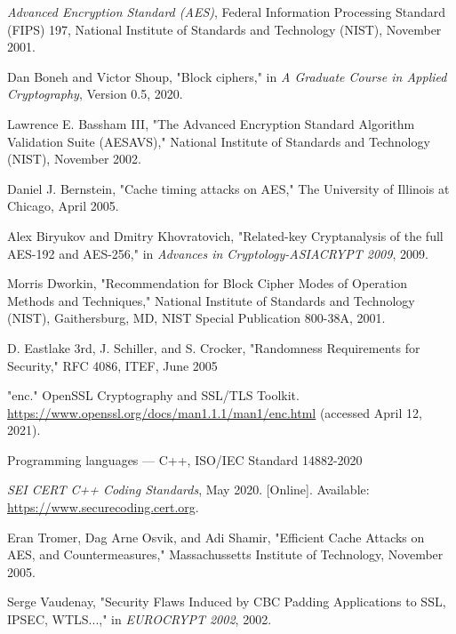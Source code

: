 \documentclass[a4paper,12pt]{article}
\begin{document}
\begin{thebibliography}{99}

 \textit{Advanced Encryption Standard (AES)}, Federal Information Processing Standard (FIPS) 197, National Institute of Standards and Technology (NIST), November 2001.

 Dan Boneh and Victor Shoup, "Block ciphers," in \textit{A Graduate Course in Applied Cryptography}, Version 0.5, 2020.

 Lawrence E. Bassham III, "The Advanced Encryption Standard Algorithm Validation Suite (AESAVS)," National Institute of Standards and Technology (NIST), November 2002.

 Daniel J. Bernstein, "Cache timing attacks on AES," The University of Illinois at Chicago, April 2005.

 Alex Biryukov and Dmitry Khovratovich, "Related-key Cryptanalysis of the full AES-192 and AES-256," in \textit{Advances in Cryptology-ASIACRYPT 2009}, 2009.

 Morris Dworkin, "Recommendation for Block Cipher Modes of Operation Methods and Techniques," National Institute of Standards and Technology (NIST), Gaithersburg, MD, NIST Special Publication 800-38A, 2001.

 D. Eastlake 3rd, J. Schiller, and S. Crocker, "Randomness Requirements for Security," RFC 4086, ITEF, June 2005

 "enc." OpenSSL Cryptography and SSL/TLS Toolkit. \href{https://www.openssl.org/docs/man1.1.1/man1/enc.html}{https://www.openssl.org/docs/man1.1.1/man1/enc.html} (accessed April 12, 2021).

 Programming languages — C++, ISO/IEC Standard 14882-2020

 \textit{SEI CERT C++ Coding Standards}, May 2020. [Online]. Available: \href{https://www.securecoding.cert.org}{https://www.securecoding.cert.org}.

 Eran Tromer, Dag Arne Osvik, and Adi Shamir, "Efficient Cache Attacks on AES, and Countermeasures," Massachussetts Institute of Technology, November 2005.

 Serge Vaudenay, "Security Flaws Induced by CBC Padding Applications to SSL, IPSEC, WTLS...," in \textit{EUROCRYPT 2002}, 2002.

\end{thebibliography}
\end{document}

